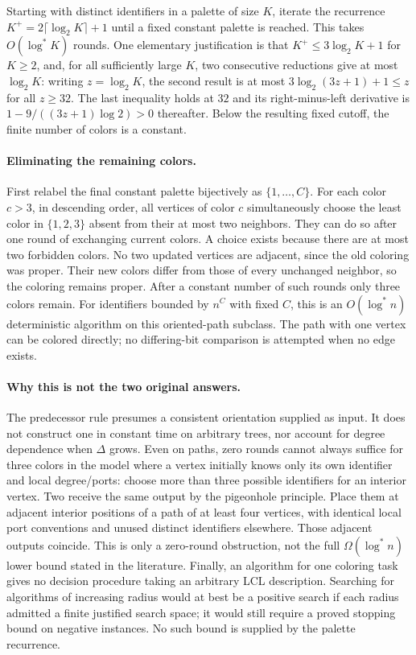 \documentclass[11pt]{article}
\begin{document}
Starting with distinct identifiers in a palette of size $K$, iterate the
recurrence $K^+=2\lceil\log_2K\rceil+1$ until a fixed constant palette
is reached. This takes $O(\log^*K)$ rounds. One elementary justification is
that $K^+\leq3\log_2K+1$ for $K\geq2$, and, for all sufficiently large
$K$, two consecutive reductions give at most $\log_2K$: writing
$z=\log_2K$, the second result is at most
$3\log_2(3z+1)+1\leq z$ for all $z\geq32$.
The last inequality holds at $32$ and its right-minus-left derivative is
$1-9/((3z+1)\log2)>0$ thereafter.
Below the resulting fixed cutoff, the finite number of colors is a constant.

\paragraph{Eliminating the remaining colors.}
First relabel the final constant palette bijectively as $\{1,\ldots,C\}$.
For each color $c>3$, in descending order, all vertices of color $c$
simultaneously choose the least color in $\{1,2,3\}$ absent from their at most
two neighbors. They can do so after one round of exchanging current colors.
A choice exists because there are at most two forbidden colors. No two updated
vertices are adjacent, since the old coloring was proper. Their new colors
differ from those of every unchanged neighbor, so the coloring remains proper.
After a constant number of such rounds only three colors remain.
For identifiers bounded by $n^C$ with fixed $C$, this is an
$O(\log^*n)$ deterministic algorithm on this oriented-path subclass.
The path with one vertex can be colored directly; no differing-bit comparison
is attempted when no edge exists.

\paragraph{Why this is not the two original answers.}
The predecessor rule presumes a consistent orientation supplied as input.
It does not construct one in constant time on arbitrary trees, nor account
for degree dependence when $\Delta$ grows. Even on paths, zero rounds cannot
always suffice for three colors in the model where a vertex initially knows
only its own identifier and local degree/ports: choose more than three
possible identifiers for an interior vertex. Two receive the same output by
the pigeonhole principle. Place them at adjacent interior positions of a path
of at least four vertices, with identical local port conventions and unused
distinct identifiers elsewhere. Those adjacent outputs coincide.
This is only a zero-round obstruction, not the full $\Omega(\log^*n)$ lower
bound stated in the literature.
Finally, an algorithm for one coloring task gives no decision procedure taking
an arbitrary LCL description. Searching for algorithms of increasing radius
would at best be a positive search if each radius admitted a finite justified
search space; it would still require a proved stopping bound on negative
instances. No such bound is supplied by the palette recurrence.
\end{document}
